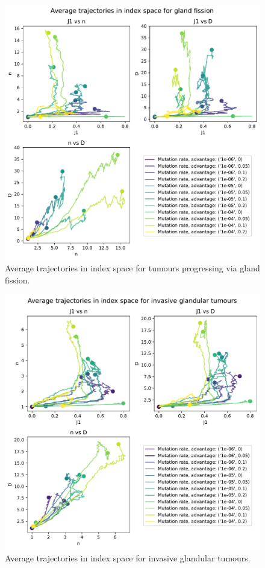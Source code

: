\begin{figure}
    \centering
    \includegraphics[width=\textwidth]{Chapter_trajectories/figures/indspace-gland.pdf}
    \caption{Average trajectories in index space for tumours progressing via gland fission.}
    \label{fig:gland-indspace}
\end{figure}
\begin{figure}
    \centering
    \includegraphics[width=\textwidth]{Chapter_trajectories/figures/indspace-inv-gland.pdf}
    \caption{Average trajectories in index space for invasive glandular tumours.}
    \label{fig:inv-gland-indspace}
\end{figure}

